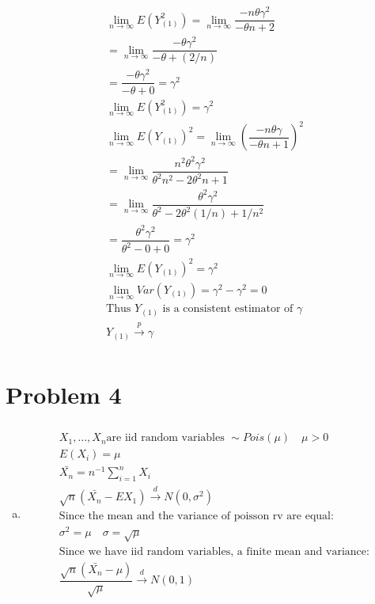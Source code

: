\documentclass{article}
\begin{document}
\begin{flushleft}
\begin{multline*}
\lim_{n\to \infty}E(Y_{(1)}^2)=\lim_{n\to \infty}\dfrac{-n\theta\gamma^2}{-\theta n+2}\\
=\lim_{n\to \infty}\dfrac{-\theta \gamma^2}{-\theta+(2/n)}\\
=\dfrac{-\theta \gamma^2}{-\theta+0}=\gamma^2\\
\lim_{n\to \infty} E(Y_{(1)}^2)=\gamma^2\\
\lim_{n\to \infty} E(Y_{(1)})^2=\lim_{n\to \infty}\left(\dfrac{-n\theta\gamma}{-\theta n+1}\right)^2\\
=\lim_{n\to \infty}\dfrac{n^2\theta^2\gamma^2}{\theta^2 n^2-2\theta^2n+1}\\
=\lim_{n\to \infty}\dfrac{\theta^2\gamma^2}{\theta^2 -2\theta^2(1/n)+1/n^2}\\
=\dfrac{\theta^2\gamma^2}{\theta^2-0+0}=\gamma^2\\
\lim_{n\to \infty} E(Y_{(1)})^2=\gamma^2\\
\lim_{n\to \infty} Var(Y_{(1)})=\gamma^2-\gamma^2=0\\
\text{Thus } Y_{(1)} \text{ is a consistent estimator of } \gamma\\
Y_{(1)}\overset{p}{\to}\gamma\\
\end{multline*}
	\section*{Problem 4}
	
\begin{enumerate}[(a)]
	
	\item 	
\begin{multline*}\\
X_1,\dots,X_n \text{are iid random variables } \sim Pois(\mu) \quad \mu>0\\
E(X_i)=\mu \\
\bar{X_n}=n^{-1}\sum_{i=1}^{n}X_i\\
\sqrt{n}(\bar{X_n}-EX_1)\overset{d}{\to} N(0,\sigma^2)\\
\text{Since the mean and the variance of poisson rv are equal:}\\
\sigma^2=\mu \quad \sigma=\sqrt{\mu}\\
\text{Since we have iid random variables, a finite mean and variance:}\\
\dfrac{\sqrt{n}(\bar{X_n}-\mu)}{\sqrt{\mu}}\overset{d}{\to}N(0,1)\\
\end{multline*}


\end{enumerate}
\end{flushleft}
\end{document}
